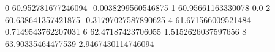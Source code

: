 0 60.952781677246094 -0.0038299560546875
1 60.95661163330078 0.0
2 60.638641357421875 -0.31797027587890625
4 61.671566009521484 0.7149543762207031
6 62.47187423706055 1.5152626037597656
8 63.90335464477539 2.9467430114746094
